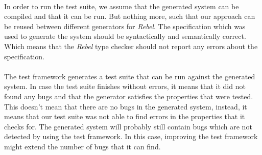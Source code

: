 \\
In order to run the test suite, we assume that the generated system can be
compiled and that it can be run. But nothing more, such that our approach can be
reused between different generators for \textit{Rebel}. The specification which was used
to generate the system should be syntactically and semantically correct. Which
means that the \textit{Rebel} type checker should not report any errors about the
specification.\\
\\
The test framework generates a test suite that can be run against the generated
system. In case the test suite finishes without errors, it means that it did not
found any bugs and that the generator satisfies the properties that were tested.
This doesn't mean that there are no bugs in the generated system, instead, it
means that our test suite was not able to find errors in the properties that it
checks for. The generated system will probably still contain bugs which are not
detected by using the test framework. In this case, improving the test framework
might extend the number of bugs that it can find.

